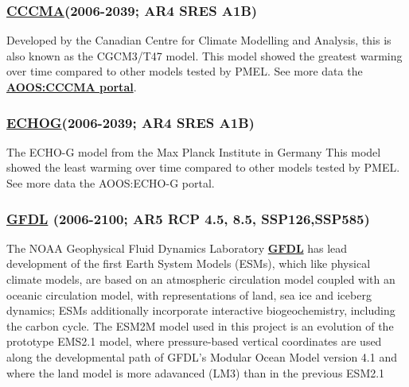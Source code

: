 \documentclass[
]{article}
\begin{document}
\hypertarget{cccma2006-2039-ar4-sres-a1b}{%
\subsubsection{\texorpdfstring{\href{http://www.cccma.ec.gc.ca/diagnostics/cgcm3/cgcm3.shtml}{CCCMA}(2006-2039;
AR4 SRES
A1B)}{CCCMA(2006-2039; AR4 SRES A1B)}}\label{cccma2006-2039-ar4-sres-a1b}}

Developed by the Canadian Centre for Climate Modelling and Analysis,
this is also known as the CGCM3/T47 model. This model showed the
greatest warming over time compared to other models tested by PMEL. See
more data the
\href{http://portal.aoos.org/bering-sea.php\#module-metadata/4f706756-7d57-11e3-bce5-00219bfe5678/ffa1bcc1-288d-4f8e-912e-500a618b241a}{\textbf{AOOS:CCCMA
portal}}.

\hypertarget{echog2006-2039-ar4-sres-a1b}{%
\subsubsection{\texorpdfstring{\href{http://www-pcmdi.llnl.gov/ipcc/model_documentation/ECHO-G.pdf}{ECHOG}(2006-2039;
AR4 SRES
A1B)}{ECHOG(2006-2039; AR4 SRES A1B)}}\label{echog2006-2039-ar4-sres-a1b}}

The ECHO-G model from the Max Planck Institute in Germany This model
showed the least warming over time compared to other models tested by
PMEL. See more data the AOOS:ECHO-G portal.

\hypertarget{gfdl-2006-2100-ar5-rcp-4.5-8.5-ssp126ssp585}{%
\subsubsection{\texorpdfstring{\href{http://www.gfdl.noaa.gov/earth-system-model}{GFDL}
(2006-2100; AR5 RCP 4.5, 8.5,
SSP126,SSP585)}{GFDL (2006-2100; AR5 RCP 4.5, 8.5, SSP126,SSP585)}}\label{gfdl-2006-2100-ar5-rcp-4.5-8.5-ssp126ssp585}}

The NOAA Geophysical Fluid Dynamics Laboratory
\href{http://www.gfdl.noaa.gov}{\textbf{GFDL}} has lead development of
the first Earth System Models (ESMs), which like physical climate
models, are based on an atmospheric circulation model coupled with an
oceanic circulation model, with representations of land, sea ice and
iceberg dynamics; ESMs additionally incorporate interactive
biogeochemistry, including the carbon cycle. The ESM2M model used in
this project is an evolution of the prototype EMS2.1 model, where
pressure-based vertical coordinates are used along the developmental
path of GFDL's Modular Ocean Model version 4.1 and where the land model
is more adavanced (LM3) than in the previous ESM2.1
\end{document}
